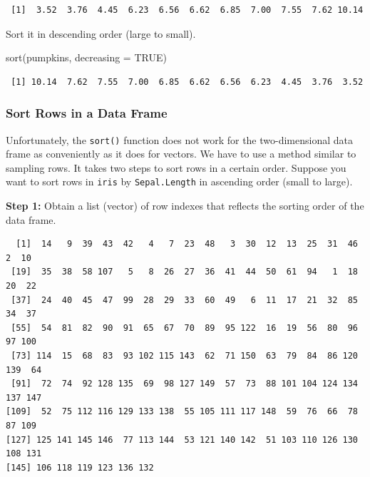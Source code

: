 \documentclass[
  letterpaper,
  DIV=11,
  numbers=noendperiod]{scrreprt}
\newenvironment{Shaded}{\begin{snugshade}}{\end{snugshade}}
\newcommand{\AttributeTok}[1]{\textcolor[rgb]{0.40,0.45,0.13}{#1}}
\newcommand{\ConstantTok}[1]{\textcolor[rgb]{0.56,0.35,0.01}{#1}}
\newcommand{\FunctionTok}[1]{\textcolor[rgb]{0.28,0.35,0.67}{#1}}
\newcommand{\NormalTok}[1]{\textcolor[rgb]{0.00,0.23,0.31}{#1}}
\newcommand{\OtherTok}[1]{\textcolor[rgb]{0.00,0.23,0.31}{#1}}
\newcommand{\SpecialCharTok}[1]{\textcolor[rgb]{0.37,0.37,0.37}{#1}}
\begin{document}
\begin{verbatim}
 [1]  3.52  3.76  4.45  6.23  6.56  6.62  6.85  7.00  7.55  7.62 10.14
\end{verbatim}

Sort it in descending order (large to small).

\begin{Shaded}
\begin{Highlighting}[]
\FunctionTok{sort}\NormalTok{(pumpkins, }\AttributeTok{decreasing =} \ConstantTok{TRUE}\NormalTok{)}
\end{Highlighting}
\end{Shaded}

\begin{verbatim}
 [1] 10.14  7.62  7.55  7.00  6.85  6.62  6.56  6.23  4.45  3.76  3.52
\end{verbatim}

\subsubsection{Sort Rows in a Data
Frame}\label{sort-rows-in-a-data-frame}

Unfortunately, the \texttt{sort()} function does not work for the
two-dimensional data frame as conveniently as it does for vectors. We
have to use a method similar to sampling rows. It takes two steps to
sort rows in a certain order. Suppose you want to sort rows in
\texttt{iris} by \texttt{Sepal.Length} in ascending order (small to
large).

\textbf{Step 1:} Obtain a list (vector) of row indexes that reflects the
sorting order of the data frame.

\begin{Shaded}
\end{Shaded}

\begin{verbatim}
  [1]  14   9  39  43  42   4   7  23  48   3  30  12  13  25  31  46   2  10
 [19]  35  38  58 107   5   8  26  27  36  41  44  50  61  94   1  18  20  22
 [37]  24  40  45  47  99  28  29  33  60  49   6  11  17  21  32  85  34  37
 [55]  54  81  82  90  91  65  67  70  89  95 122  16  19  56  80  96  97 100
 [73] 114  15  68  83  93 102 115 143  62  71 150  63  79  84  86 120 139  64
 [91]  72  74  92 128 135  69  98 127 149  57  73  88 101 104 124 134 137 147
[109]  52  75 112 116 129 133 138  55 105 111 117 148  59  76  66  78  87 109
[127] 125 141 145 146  77 113 144  53 121 140 142  51 103 110 126 130 108 131
[145] 106 118 119 123 136 132
\end{verbatim}
\end{document}
